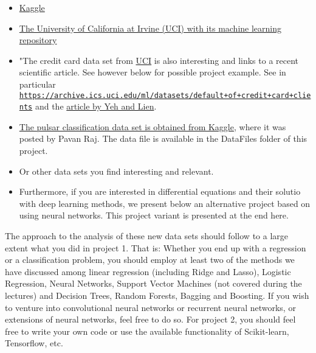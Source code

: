 \documentclass[%
oneside,                 %
final,                   %
10pt]{article}
\begin{document}
\begin{itemize}
\item \href{{https://www.kaggle.com/datasets}}{Kaggle}

\item \href{{https://archive.ics.uci.edu/ml/index.php}}{The University of California at Irvine (UCI) with its machine learning repository}

\item "The credit card data set from \href{{https://archive.ics.uci.edu/ml/index.php}}{UCI} is also interesting and links to a recent scientific article. See however below for possible project example. See in particular \href{{https://archive.ics.uci.edu/ml/datasets/default+of+credit+card+clients}}{\nolinkurl{https://archive.ics.uci.edu/ml/datasets/default+of+credit+card+clients}} and the \href{{https://www.sciencedirect.com/science/article/abs/pii/S0957417407006719}}{article by Yeh and Lien}. 

\item \href{{https://www.kaggle.com/pavanraj159/predicting-pulsar-star-in-the-universe/notebook?scriptVersionId=4487650}}{The pulsar classification data set is obtained from Kaggle}, where it was posted by Pavan Raj. The data file is available in the DataFiles folder of this project.

\item Or other data sets you find interesting and relevant.

\item Furthermore, if you are interested in differential equations and their solutio with deep learning methods, we present below an alternative project based on using neural networks.  This project variant is presented at the end here.
\end{itemize}

\noindent
The approach to the analysis of these new data sets should follow to a
large extent what you did in project 1. That is: Whether you end up
with a regression or a classification problem, you should employ at
least two of the methods we have discussed among linear regression
(including Ridge and Lasso), Logistic Regression, Neural Networks,
Support Vector Machines (not covered during the lectures) and Decision Trees, Random Forests, Bagging and Boosting. If you
wish to venture into convolutional neural networks or recurrent neural
networks, or extensions of neural networks, feel free to do so.  For
project 2, you should feel free to write your own code or use the
available functionality of Scikit-learn, Tensorflow, etc.
\end{document}
